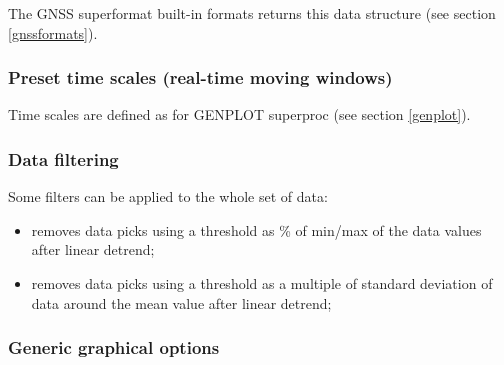 The GNSS superformat built-in formats returns this data structure (see section \ref{gnssformats}).

\subsubsection{Preset time scales (real-time moving windows)}

Time scales are defined as for GENPLOT superproc (see section \ref{genplot}).


\subsubsection{Data filtering}

Some filters can be applied to the whole set of data:
\begin{itemize}
	\item {} removes data picks using a threshold as \% of min/max of the data values after linear detrend;
	\item {} removes data picks using a threshold as a multiple of standard deviation of data around the mean value after linear detrend;
\end{itemize}


\subsubsection{Generic graphical options}

